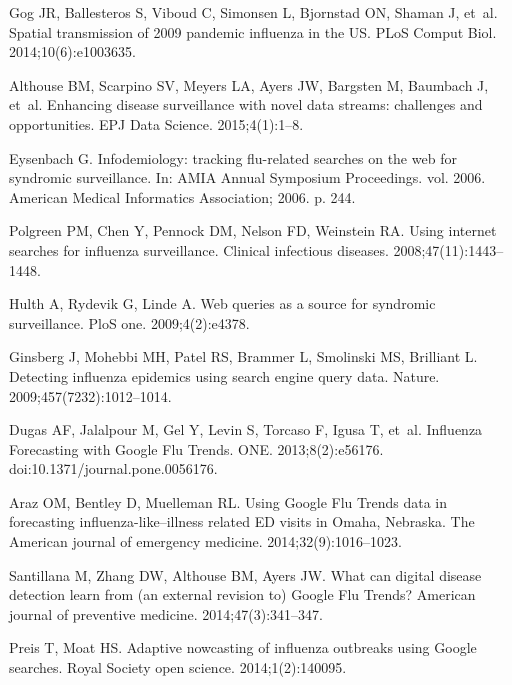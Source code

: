 \documentclass[10pt,letterpaper]{article}
\begin{document}
\begin{thebibliography}{10}
Gog JR, Ballesteros S, Viboud C, Simonsen L, Bjornstad ON, Shaman J, et~al.
\newblock Spatial transmission of 2009 pandemic influenza in the US.
\newblock PLoS Comput Biol. 2014;10(6):e1003635.

Althouse BM, Scarpino SV, Meyers LA, Ayers JW, Bargsten M, Baumbach J, et~al.
\newblock Enhancing disease surveillance with novel data streams: challenges
  and opportunities.
\newblock EPJ Data Science. 2015;4(1):1--8.

Eysenbach G.
\newblock Infodemiology: tracking flu-related searches on the web for syndromic
  surveillance.
\newblock In: AMIA Annual Symposium Proceedings. vol. 2006. American Medical
  Informatics Association; 2006. p. 244.

Polgreen PM, Chen Y, Pennock DM, Nelson FD, Weinstein RA.
\newblock Using internet searches for influenza surveillance.
\newblock Clinical infectious diseases. 2008;47(11):1443--1448.

Hulth A, Rydevik G, Linde A.
\newblock Web queries as a source for syndromic surveillance.
\newblock PloS one. 2009;4(2):e4378.

Ginsberg J, Mohebbi MH, Patel RS, Brammer L, Smolinski MS, Brilliant L.
\newblock Detecting influenza epidemics using search engine query data.
\newblock Nature. 2009;457(7232):1012--1014.

Dugas AF, Jalalpour M, Gel Y, Levin S, Torcaso F, Igusa T, et~al.
\newblock Influenza Forecasting with Google Flu Trends.
 {ONE}. 2013;8(2):e56176.
\newblock doi:{10.1371/journal.pone.0056176}.

Araz OM, Bentley D, Muelleman RL.
\newblock Using Google Flu Trends data in forecasting influenza-like--illness
  related ED visits in Omaha, Nebraska.
\newblock The American journal of emergency medicine. 2014;32(9):1016--1023.

Santillana M, Zhang DW, Althouse BM, Ayers JW.
\newblock What can digital disease detection learn from (an external revision
  to) Google Flu Trends?
\newblock American journal of preventive medicine. 2014;47(3):341--347.

Preis T, Moat HS.
\newblock Adaptive nowcasting of influenza outbreaks using Google searches.
\newblock Royal Society open science. 2014;1(2):140095.


\end{thebibliography}
\end{document}
